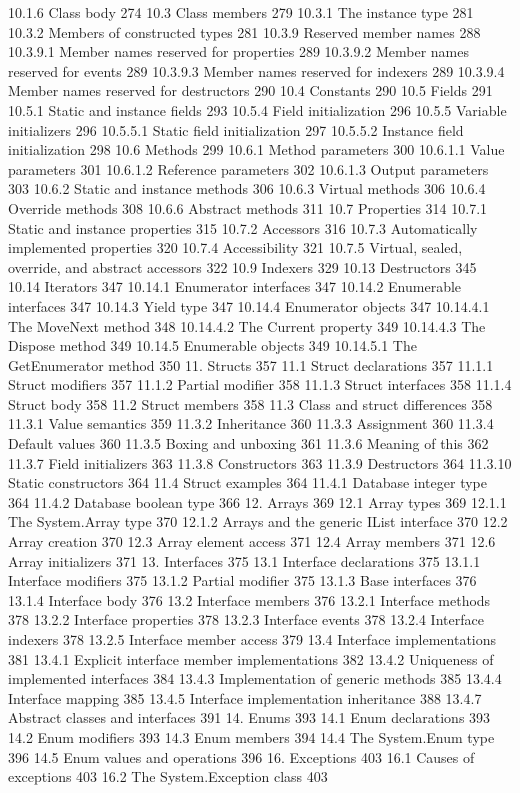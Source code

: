 10.1.6 Class body	274
10.3 Class members	279
10.3.1 The instance type	281
10.3.2 Members of constructed types	281
10.3.9 Reserved member names	288
10.3.9.1 Member names reserved for properties	289
10.3.9.2 Member names reserved for events	289
10.3.9.3 Member names reserved for indexers	289
10.3.9.4 Member names reserved for destructors	290
10.4 Constants	290
10.5 Fields	291
10.5.1 Static and instance fields	293
10.5.4 Field initialization	296
10.5.5 Variable initializers	296
10.5.5.1 Static field initialization	297
10.5.5.2 Instance field initialization	298
10.6 Methods	299
10.6.1 Method parameters	300
10.6.1.1 Value parameters	301
10.6.1.2 Reference parameters	302
10.6.1.3 Output parameters	303
10.6.2 Static and instance methods	306
10.6.3 Virtual methods	306
10.6.4 Override methods	308
10.6.6 Abstract methods	311
10.7 Properties	314
10.7.1 Static and instance properties	315
10.7.2 Accessors	316
10.7.3 Automatically implemented properties	320
10.7.4 Accessibility	321
10.7.5 Virtual, sealed, override, and abstract accessors	322
10.9 Indexers	329
10.13 Destructors	345
10.14 Iterators	347
10.14.1 Enumerator interfaces	347
10.14.2 Enumerable interfaces	347
10.14.3 Yield type	347
10.14.4 Enumerator objects	347
10.14.4.1 The MoveNext method	348
10.14.4.2 The Current property	349
10.14.4.3 The Dispose method	349
10.14.5 Enumerable objects	349
10.14.5.1 The GetEnumerator method	350
11. Structs	357
11.1 Struct declarations	357
11.1.1 Struct modifiers	357
11.1.2 Partial modifier	358
11.1.3 Struct interfaces	358
11.1.4 Struct body	358
11.2 Struct members	358
11.3 Class and struct differences	358
11.3.1 Value semantics	359
11.3.2 Inheritance	360
11.3.3 Assignment	360
11.3.4 Default values	360
11.3.5 Boxing and unboxing	361
11.3.6 Meaning of this	362
11.3.7 Field initializers	363
11.3.8 Constructors	363
11.3.9 Destructors	364
11.3.10 Static constructors	364
11.4 Struct examples	364
11.4.1 Database integer type	364
11.4.2 Database boolean type	366
12. Arrays	369
12.1 Array types	369
12.1.1 The System.Array type	370
12.1.2 Arrays and the generic IList interface	370
12.2 Array creation	370
12.3 Array element access	371
12.4 Array members	371
12.6 Array initializers	371
13. Interfaces	375
13.1 Interface declarations	375
13.1.1 Interface modifiers	375
13.1.2 Partial modifier	375
13.1.3 Base interfaces	376
13.1.4 Interface body	376
13.2 Interface members	376
13.2.1 Interface methods	378
13.2.2 Interface properties	378
13.2.3 Interface events	378
13.2.4 Interface indexers	378
13.2.5 Interface member access	379
13.4 Interface implementations	381
13.4.1 Explicit interface member implementations	382
13.4.2 Uniqueness of implemented interfaces	384
13.4.3 Implementation of generic methods	385
13.4.4 Interface mapping	385
13.4.5 Interface implementation inheritance	388
13.4.7 Abstract classes and interfaces	391
14. Enums	393
14.1 Enum declarations	393
14.2 Enum modifiers	393
14.3 Enum members	394
14.4 The System.Enum type	396
14.5 Enum values and operations	396
16. Exceptions	403
16.1 Causes of exceptions	403
16.2 The System.Exception class	403
